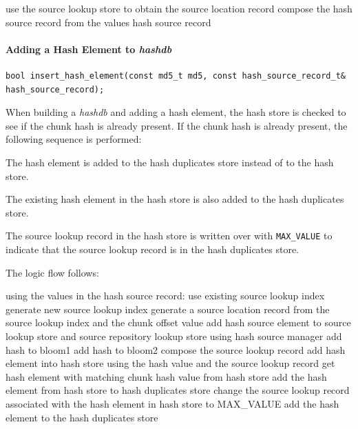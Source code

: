 \documentclass[12pt,twoside]{article}
\newcommand{\hdb}{\emph{hashdb}\xspace}
\begin{document}
\begin{algorithmic}
\STATE use the source lookup store to obtain the source location record
\STATE compose the hash source record from the values
\RETURN hash source record
\end{algorithmic}

\paragraph{Adding a Hash Element to \hdb}
\begin{small}
\begin{verbatim}
bool insert_hash_element(const md5_t md5, const hash_source_record_t& hash_source_record);
\end{verbatim}
\end{small}
When building a \hdb and adding a hash element,
the hash store is checked to see if the chunk hash is already present.
If the chunk hash is already present, the following sequence is performed:
\begin{compactitem}
\item The hash element is added to the hash duplicates store instead of to the hash store.
\item The existing hash element in the hash store is also added to the hash duplicates store.
\item The source lookup record in the hash store
is written over with \texttt{MAX\_VALUE}
to indicate that the source lookup record is in the hash duplicates store.
\end{compactitem}
The logic flow follows:
\begin{algorithmic}
\STATE using the values in the hash source record:
  \RETURN \FALSE
\ENDIF
{}
  \STATE use existing source lookup index
\ELSE
  \STATE generate new source lookup index
\ENDIF
\STATE generate a source location record from the source lookup index and the chunk offset value
\STATE add hash source element to source lookup store and source repository lookup store using hash source manager
  \STATE add hash to bloom1
\ENDIF
{}
  \STATE add hash to bloom2
\ENDIF
\STATE compose the source lookup record
  \STATE add hash element into hash store using the hash value and the source lookup record
\ELSE
  \STATE get hash element with matching chunk hash value from hash store
    \STATE add the hash element from hash store to hash duplicates store
    \STATE change the source lookup record associated with the hash element in hash store to MAX\_VALUE
  \ENDIF
  \STATE add the hash element to the hash duplicates store
\ENDIF
\end{algorithmic}
\end{document}
